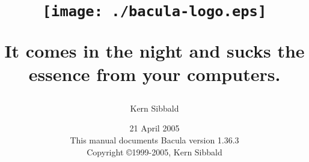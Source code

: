 \documentclass[11pt,a4paper]{book}
\begin{document}
\sloppy

\parskip 10pt
\parindent 0pt

\title{\texttt{[image: ./bacula-logo.eps]} \\ \bigskip
  \begin{center}
   \large{It comes in the night and sucks 
          the essence from your computers. }
  \end{center}
}
\author{Kern Sibbald}
\date{\vspace{2.0in} 21 April 2005 \\
      This manual documents Bacula version 1.36.3 \\
      Copyright \copyright 1999-2005, Kern Sibbald }

\maketitle

\clearpage
\tableofcontents
\clearpage
\listoffigures
\clearpage
\listoftables
\clearpage






















































\clearpage
\printindex[dir]
\printindex[fd]
\printindex[sd]
\printindex[console]
\printindex[general]
\end{document}
